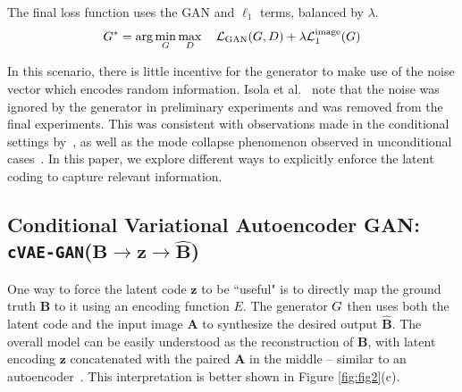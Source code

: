 \documentclass{article}
\newcommand{\cvaegan}{\texttt{cVAE-GAN}\xspace}
\newcommand{\D}{D\xspace}
\newcommand{\E}{E\xspace}
\newcommand{\A}{\mathbf{A}\xspace}
\newcommand{\B}{\mathbf{B}\xspace}
\newcommand{\z}{\mathbf{z}\xspace}
\begin{document}
The final loss function uses the GAN and $\ell_1$ terms, balanced by $\lambda$. 
\begin{equation}
\G^{*} = \arg\min_{\G} \max_{\D} \quad \mathcal{L}_{\text{GAN}}(\G,\D) + \lambda \mathcal{L}_1^{\text{image}}(\G)
\end{equation}

In this scenario, there is little incentive for the generator to make use of the noise vector which encodes random information.
Isola et al.~\citep{isola2016image} note that the noise was ignored by the generator in preliminary experiments and was removed from the final experiments.
This was consistent with observations made in the conditional settings by~\citep{pathakCVPR16context,mathieu2015deep}, as well as the mode collapse phenomenon observed in unconditional cases~\citep{salimans2016improved,goodfellow2016nips}.
In this paper, we explore different ways to explicitly enforce
the latent coding to
capture relevant information.

\subsection{Conditional Variational Autoencoder GAN: \cvaegan ($\B \rightarrow \z \rightarrow \widehat{\mathbf{B}}$)}
One way to force the latent code $\z$ to be ``useful" is to directly map the ground truth $\B$ to it using an encoding function $\E$.
The generator $G$ then uses both the latent code and the input image $\A$ to synthesize the desired output $\widehat{\mathbf{B}}$.
The overall model can be easily understood as the reconstruction of $\B$, with latent encoding $\z$ concatenated with the paired $\A$ in the middle -- similar to an autoencoder~\citep{hinton2006reducing}. This interpretation is better shown in Figure \ref{fig:fig2}(c).
\end{document}
